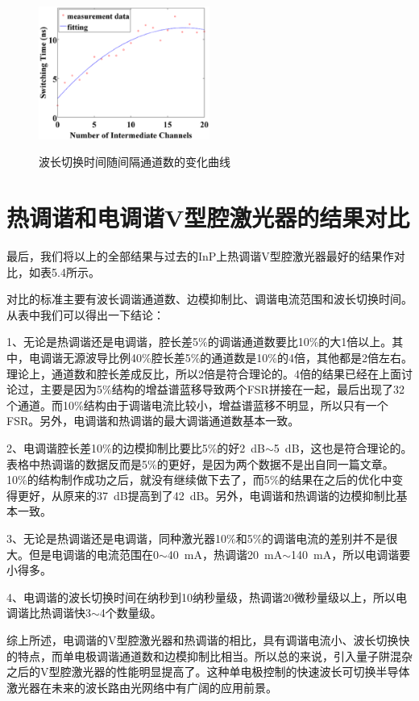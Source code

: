 \documentclass{ZJUthesis}
\begin{document}
\begin{figure}[htbp]
  \centering
  \includegraphics[width=0.5\textwidth]{./Pictures/switch4.eps}\\
  \caption{波长切换时间随间隔通道数的变化曲线}
  \label{fig_switch4}
\end{figure}

\section{热调谐和电调谐V型腔激光器的结果对比}

最后，我们将以上的全部结果与过去的InP上热调谐V型腔激光器最好的结果作对比，如表5.4所示。

对比的标准主要有波长调谐通道数、边模抑制比、调谐电流范围和波长切换时间。从表中我们可以得出一下结论：

1、无论是热调谐还是电调谐，腔长差5\%的调谐通道数要比10\%的大1倍以上。其中，电调谐无源波导比例40\%腔长差5\%的通道数是10\%的4倍，其他都是2倍左右。理论上，通道数和腔长差成反比，所以2倍是符合理论的。4倍的结果已经在上面讨论过，主要是因为5\%结构的增益谱蓝移导致两个FSR拼接在一起，最后出现了32个通道。而10\%结构由于调谐电流比较小，增益谱蓝移不明显，所以只有一个FSR。另外，电调谐和热调谐的最大调谐通道数基本一致。

2、电调谐腔长差10\%的边模抑制比要比5\%的好2~dB$\sim$5~dB，这也是符合理论的。表格中热调谐的数据反而是5\%的更好，是因为两个数据不是出自同一篇文章。10\%的结构制作成功之后，就没有继续做下去了，而5\%的结果在之后的优化中变得更好，从原来的37~dB提高到了42~dB。另外，电调谐和热调谐的边模抑制比基本一致。

3、无论是热调谐还是电调谐，同种激光器10\%和5\%的调谐电流的差别并不是很大。但是电调谐的电流范围在0$\sim$40~mA，热调谐20~mA$\sim$140~mA，所以电调谐要小得多。

4、电调谐的波长切换时间在纳秒到10纳秒量级，热调谐20微秒量级以上，所以电调谐比热调谐快3$\sim$4个数量级。

综上所述，电调谐的V型腔激光器和热调谐的相比，具有调谐电流小、波长切换快的特点，而单电极调谐通道数和边模抑制比相当。所以总的来说，引入量子阱混杂之后的V型腔激光器的性能明显提高了。这种单电极控制的快速波长可切换半导体激光器在未来的波长路由光网络中有广阔的应用前景。
\end{document}
